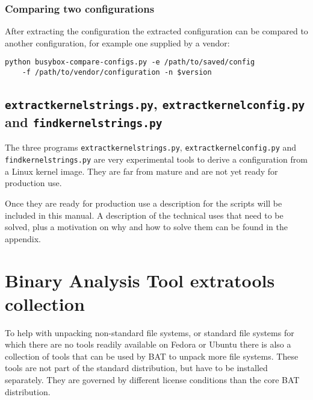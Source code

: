 \documentclass[10pt]{article}
\begin{document}
\subsubsection{Comparing two configurations}

After extracting the configuration the extracted configuration can be compared
to another configuration, for example one supplied by a vendor:

\begin{verbatim}
python busybox-compare-configs.py -e /path/to/saved/config
    -f /path/to/vendor/configuration -n $version
\end{verbatim}

\subsection{\texttt{extractkernelstrings.py}, \texttt{extractkernelconfig.py}
\\and \texttt{findkernelstrings.py}}

The three programs \texttt{extractkernelstrings.py},
\texttt{extractkernelconfig.py} and \texttt{findkernelstrings.py} are very
experimental tools to derive a configuration from a Linux kernel image. They
are far from mature and are not yet ready for production use.

Once they are ready for production use a description for the scripts will be
included in this manual. A description of the technical uses that need to be
solved, plus a motivation on why and how to solve them can be found in the
appendix.



\section{Binary Analysis Tool extratools collection}

To help with unpacking non-standard file systems, or standard file systems for
which there are no tools readily available on Fedora or Ubuntu there is also
a collection of tools that can be used by BAT to unpack more file systems.
These tools are not part of the standard distribution, but have to be installed
separately. They are governed by different license conditions than the core BAT
distribution.
\end{document}
